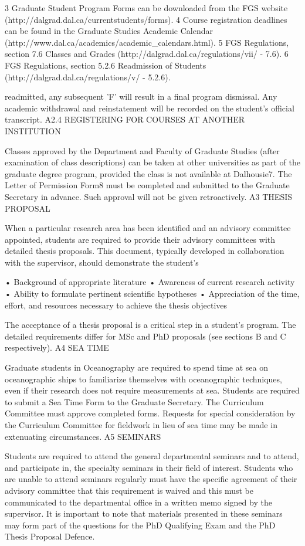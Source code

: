 3 Graduate Student Program Forms can be downloaded from the FGS website (http://dalgrad.dal.ca/currentstudents/forms).
4 Course registration deadlines can be found in the Graduate Studies Academic Calendar (http://www.dal.ca/academics/academic_calendars.html).
5 FGS Regulations, section 7.6 Classes and Grades (http://dalgrad.dal.ca/regulations/vii/ - 7.6).
6 FGS Regulations, section 5.2.6 Readmission of Students (http://dalgrad.dal.ca/regulations/v/ - 5.2.6).
 

readmitted, any subsequent 'F' will result in a final program dismissal. Any academic withdrawal and reinstatement will be recorded on the student's official transcript.
A2.4	REGISTERING FOR COURSES AT ANOTHER INSTITUTION

Classes approved by the Department and Faculty of Graduate Studies (after examination of class descriptions) can be taken at other universities as part of the graduate degree program, provided the class is not available at Dalhousie7.
The Letter of Permission Form8 must be completed and submitted to the Graduate Secretary in advance. Such approval will not be given retroactively.
A3	THESIS PROPOSAL

When a particular research area has been identified and an advisory committee appointed, students are required to provide their advisory committees with detailed thesis proposals. This document, typically developed in collaboration with the supervisor, should demonstrate the student's

•	Background of appropriate literature
•	Awareness of current research activity
•	Ability to formulate pertinent scientific hypotheses
•	Appreciation of the time, effort, and resources necessary to achieve the thesis objectives

The acceptance of a thesis proposal is a critical step in a student's program. The detailed requirements differ for MSc and PhD proposals (see sections B and C respectively).
A4	SEA TIME

Graduate students in Oceanography are required to spend time at sea on oceanographic ships to familiarize themselves with oceanographic techniques, even if their research does not require measurements at sea. Students are required to submit a Sea Time Form to the Graduate Secretary. The Curriculum Committee must approve completed forms. Requests for special consideration by the Curriculum Committee for fieldwork in lieu of sea time may be made in extenuating circumstances.
A5	SEMINARS

Students are required to attend the general departmental seminars and to attend, and participate in, the specialty seminars in their field of interest. Students who are unable to attend seminars regularly must have the specific agreement of their advisory committee that this requirement is waived and this must be communicated to the departmental office in a written memo signed by the supervisor. It is important to note that materials presented in these seminars may form part of the questions for the PhD Qualifying Exam and the PhD Thesis Proposal Defence.



